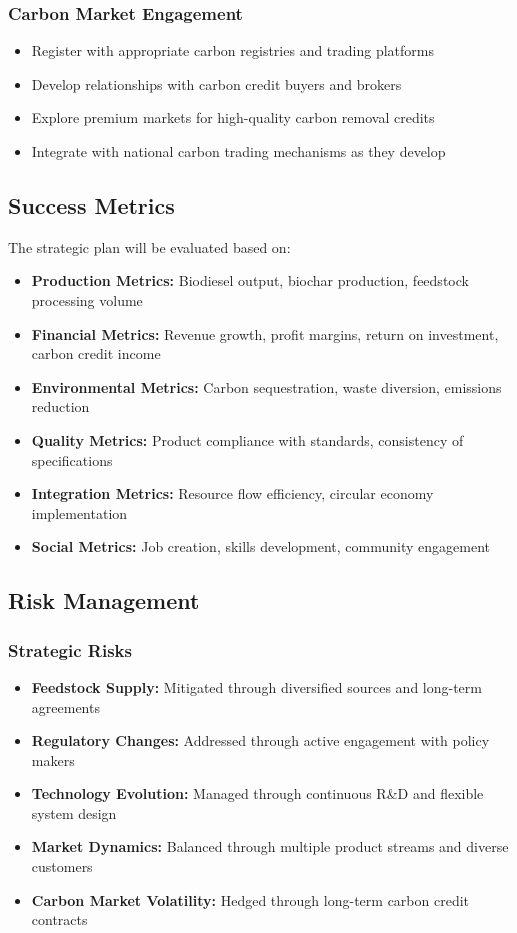 \subsubsection{Carbon Market Engagement}
\begin{itemize}
    \item Register with appropriate carbon registries and trading platforms
    \item Develop relationships with carbon credit buyers and brokers
    \item Explore premium markets for high-quality carbon removal credits
    \item Integrate with national carbon trading mechanisms as they develop
\end{itemize}

\subsection{Success Metrics}

The strategic plan will be evaluated based on:

\begin{itemize}
    \item \textbf{Production Metrics:} Biodiesel output, biochar production, feedstock processing volume
    \item \textbf{Financial Metrics:} Revenue growth, profit margins, return on investment, carbon credit income
    \item \textbf{Environmental Metrics:} Carbon sequestration, waste diversion, emissions reduction
    \item \textbf{Quality Metrics:} Product compliance with standards, consistency of specifications
    \item \textbf{Integration Metrics:} Resource flow efficiency, circular economy implementation
    \item \textbf{Social Metrics:} Job creation, skills development, community engagement
\end{itemize}

\subsection{Risk Management}

\subsubsection{Strategic Risks}
\begin{itemize}
    \item \textbf{Feedstock Supply:} Mitigated through diversified sources and long-term agreements
    \item \textbf{Regulatory Changes:} Addressed through active engagement with policy makers
    \item \textbf{Technology Evolution:} Managed through continuous R\&D and flexible system design
    \item \textbf{Market Dynamics:} Balanced through multiple product streams and diverse customers
    \item \textbf{Carbon Market Volatility:} Hedged through long-term carbon credit contracts
\end{itemize}

